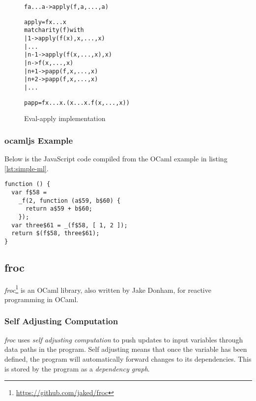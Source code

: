 \begin{figure}
  \begin{graybox}
  \begin{alltt}
f a ... a -> apply(f, a, ..., a)

apply = \lam f x ... x
  match arity(f) with
    | 1   -> apply (f(x), x, ..., x)
    | ...
    | n-1 -> apply (f(x, ..., x), x)
    | n   -> f(x, ..., x)
    | n+1 -> papp(f, x, ..., x)
    | n+2 -> papp(f, x, ..., x)
    | ...

papp = \lam f x ... x. (\lam x ... x. f(x, ..., x))
  \end{alltt}
  \end{graybox}
  \caption{Eval-apply implementation}
  \label{eval-apply}
\end{figure}

\subsubsection{ocamljs Example}
Below is the JavaScript code compiled from the OCaml example in listing \ref{lst:simple-ml}.

\begin{lstlisting}[caption={Compiled JavaScript},label=lst:simple-comp]
function () {
  var f$58 =
    _f(2, function (a$59, b$60) {
      return a$59 + b$60;
    });
  var three$61 = _(f$58, [ 1, 2 ]);
  return $(f$58, three$61);
}
\end{lstlisting}

\subsection{froc}

\emph{froc}\footnote{\url{https://github.com/jaked/froc}} is an OCaml library, also written by Jake Donham, for reactive programming in OCaml.

\subsubsection{Self Adjusting Computation}
\emph{froc} uses \emph{self adjusting computation} to push updates to input variables through data paths in the program. Self adjusting means that once the variable has been defined, the program will automatically forward changes to its dependencies. This is stored by the program as a \emph{dependency graph}.

